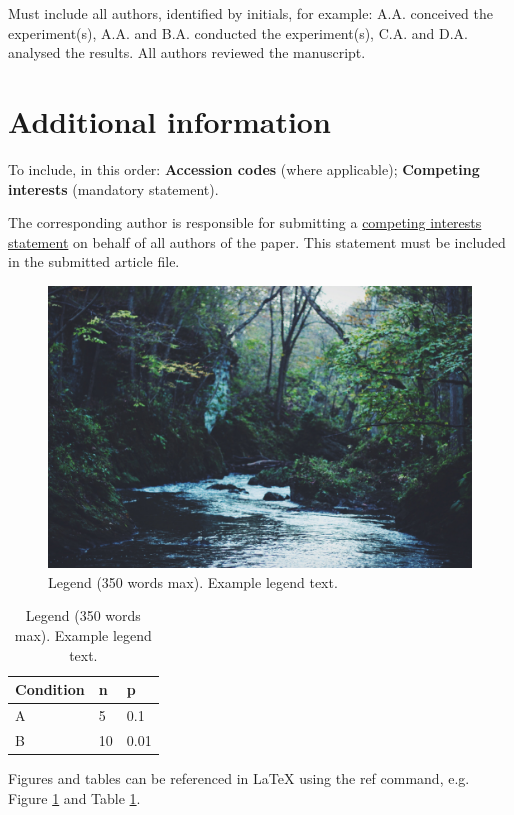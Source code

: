 \documentclass[fleqn,10pt]{wlscirep}
\begin{document}
Must include all authors, identified by initials, for example:
A.A. conceived the experiment(s),  A.A. and B.A. conducted the experiment(s), C.A. and D.A. analysed the results.  All authors reviewed the manuscript. 

\section*{Additional information}

To include, in this order: \textbf{Accession codes} (where applicable); \textbf{Competing interests} (mandatory statement). 

The corresponding author is responsible for submitting a \href{http://www.nature.com/srep/policies/index.html#competing}{competing interests statement} on behalf of all authors of the paper. This statement must be included in the submitted article file.

\begin{figure}[ht]
\centering
\includegraphics[width=\linewidth]{stream}
\caption{Legend (350 words max). Example legend text.}
\label{fig:stream}
\end{figure}

\begin{table}[ht]
\centering
\begin{tabular}{|l|l|l|}
\hline
Condition & n & p \\
\hline
A & 5 & 0.1 \\
\hline
B & 10 & 0.01 \\
\hline
\end{tabular}
\caption{\label{tab:example}Legend (350 words max). Example legend text.}
\end{table}

Figures and tables can be referenced in LaTeX using the ref command, e.g. Figure \ref{fig:stream} and Table \ref{tab:example}.
\end{document}
